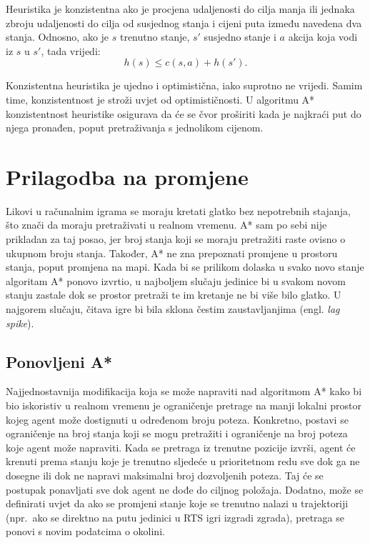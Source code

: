 \documentclass[times, utf8, zavrsni, numeric]{fer}
\begin{document}
\par Heuristika je konzistentna ako je procjena udaljenosti do cilja manja ili jednaka zbroju udaljenosti do cilja od susjednog stanja i cijeni puta između navedena dva stanja.
Odnosno, ako je \(s\) trenutno stanje, \(s'\) susjedno stanje i \(a\) akcija koja vodi iz \(s\) u \(s'\), tada vrijedi:
\[h(s) \leq c(s, a) + h(s').\]

\par Konzistentna heuristika je ujedno i optimistična, iako suprotno ne vrijedi. 
Samim time, konzistentnost je stroži uvjet od optimističnosti. 
U algoritmu A* konzistentnost heuristike osigurava da će se čvor proširiti kada je najkraći put do njega pronađen, poput pretraživanja s jednolikom cijenom.



\section{Prilagodba na promjene}\label{sec:adaptation}

\par Likovi u računalnim igrama se moraju kretati glatko bez nepotrebnih stajanja, što znači da moraju pretraživati u realnom vremenu. 
A* sam po sebi nije prikladan za taj posao, jer broj stanja koji se moraju pretražiti raste ovisno o ukupnom broju stanja. 
Također, A* ne zna prepoznati promjene u prostoru stanja, poput promjena na mapi. Kada bi se prilikom dolaska u svako novo stanje algoritam A* ponovo izvrtio, u najboljem slučaju jedinice bi u svakom novom stanju zastale dok se prostor pretraži te im kretanje ne bi više bilo glatko. 
U najgorem slučaju, čitava igre bi bila sklona čestim zaustavljanjima (engl. \textit{lag spike}).

\subsection{Ponovljeni A*}

\par Najjednostavnija modifikacija koja se može napraviti nad algoritmom A* kako bi bio iskoristiv u realnom vremenu je ograničenje pretrage na manji lokalni prostor kojeg agent može dostignuti u određenom broju poteza. 
Konkretno, postavi se ograničenje na broj stanja koji se mogu pretražiti i ograničenje na broj poteza koje agent može napraviti.
Kada se pretraga iz trenutne pozicije izvrši, agent će krenuti prema stanju koje je trenutno sljedeće u prioritetnom redu sve dok ga ne dosegne ili dok ne napravi maksimalni broj dozvoljenih poteza.
Taj će se postupak ponavljati sve dok agent ne dođe do ciljnog položaja.
Dodatno, može se definirati uvjet da ako se promjeni stanje koje se trenutno nalazi u trajektoriji (npr.\ ako se direktno na putu jedinici u RTS igri izgradi zgrada), pretraga se ponovi s novim podatcima o okolini.
\end{document}
